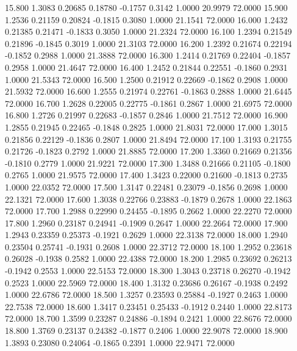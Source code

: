   15.800   1.3083   0.20685   0.18780  -0.1757   0.3142   1.0000  20.9979  72.0000
  15.900   1.2536   0.21159   0.20824  -0.1815   0.3080   1.0000  21.1541  72.0000
  16.000   1.2432   0.21385   0.21471  -0.1833   0.3050   1.0000  21.2324  72.0000
  16.100   1.2394   0.21549   0.21896  -0.1845   0.3019   1.0000  21.3103  72.0000
  16.200   1.2392   0.21674   0.22194  -0.1852   0.2988   1.0000  21.3888  72.0000
  16.300   1.2414   0.21769   0.22404  -0.1857   0.2958   1.0000  21.4647  72.0000
  16.400   1.2452   0.21844   0.22551  -0.1860   0.2931   1.0000  21.5343  72.0000
  16.500   1.2500   0.21912   0.22669  -0.1862   0.2908   1.0000  21.5932  72.0000
  16.600   1.2555   0.21974   0.22761  -0.1863   0.2888   1.0000  21.6445  72.0000
  16.700   1.2628   0.22005   0.22775  -0.1861   0.2867   1.0000  21.6975  72.0000
  16.800   1.2726   0.21997   0.22683  -0.1857   0.2846   1.0000  21.7512  72.0000
  16.900   1.2855   0.21945   0.22465  -0.1848   0.2825   1.0000  21.8031  72.0000
  17.000   1.3015   0.21856   0.22129  -0.1836   0.2807   1.0000  21.8494  72.0000
  17.100   1.3193   0.21755   0.21726  -0.1823   0.2792   1.0000  21.8885  72.0000
  17.200   1.3360   0.21669   0.21356  -0.1810   0.2779   1.0000  21.9221  72.0000
  17.300   1.3488   0.21666   0.21105  -0.1800   0.2765   1.0000  21.9575  72.0000
  17.400   1.3423   0.22000   0.21600  -0.1813   0.2735   1.0000  22.0352  72.0000
  17.500   1.3147   0.22481   0.23079  -0.1856   0.2698   1.0000  22.1321  72.0000
  17.600   1.3038   0.22766   0.23883  -0.1879   0.2678   1.0000  22.1863  72.0000
  17.700   1.2988   0.22990   0.24455  -0.1895   0.2662   1.0000  22.2270  72.0000
  17.800   1.2960   0.23187   0.24941  -0.1909   0.2647   1.0000  22.2664  72.0000
  17.900   1.2943   0.23359   0.25373  -0.1921   0.2629   1.0000  22.3138  72.0000
  18.000   1.2940   0.23504   0.25741  -0.1931   0.2608   1.0000  22.3712  72.0000
  18.100   1.2952   0.23618   0.26028  -0.1938   0.2582   1.0000  22.4388  72.0000
  18.200   1.2985   0.23692   0.26213  -0.1942   0.2553   1.0000  22.5153  72.0000
  18.300   1.3043   0.23718   0.26270  -0.1942   0.2523   1.0000  22.5969  72.0000
  18.400   1.3132   0.23686   0.26167  -0.1938   0.2492   1.0000  22.6786  72.0000
  18.500   1.3257   0.23593   0.25884  -0.1927   0.2463   1.0000  22.7538  72.0000
  18.600   1.3417   0.23451   0.25433  -0.1912   0.2440   1.0000  22.8173  72.0000
  18.700   1.3599   0.23287   0.24886  -0.1894   0.2421   1.0000  22.8676  72.0000
  18.800   1.3769   0.23137   0.24382  -0.1877   0.2406   1.0000  22.9078  72.0000
  18.900   1.3893   0.23080   0.24064  -0.1865   0.2391   1.0000  22.9471  72.0000

